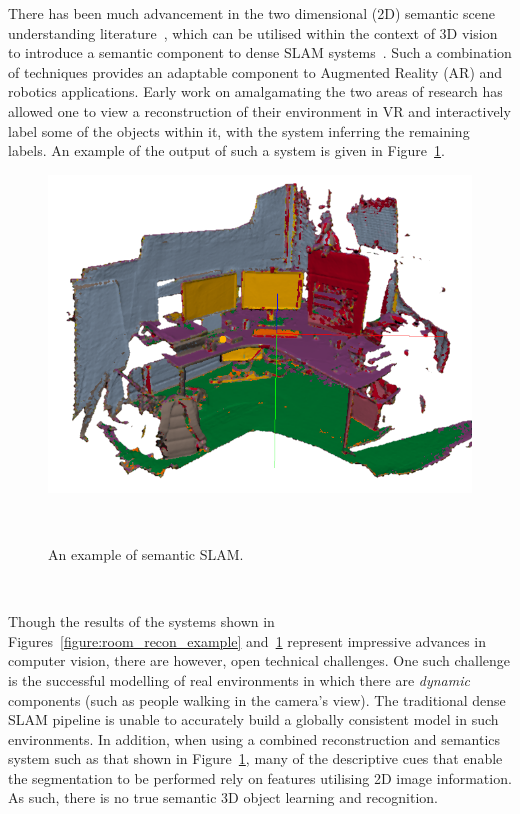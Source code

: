 There has been much advancement in the two dimensional (2D) semantic scene understanding literature~\cite{Girshick2014,Shelhamer2017,Civera2011}, 
which can be utilised within the context of 3D vision to introduce a semantic component to dense SLAM 
systems~\cite{Valentin2015,Golodetz2015,Cavallari2016}. Such a combination of techniques 
provides an adaptable component to Augmented Reality (AR) and robotics applications. Early work on amalgamating the two areas 
of research has allowed one to view a reconstruction of their environment in VR and interactively label some of the objects within it, with 
the system inferring the remaining labels. An example of the output of such a system is given in Figure~\ref{figure:spaint_teaser}.
\begin{figure}[!htbp]
  \centering
  \includegraphics[width=.8\linewidth]{figures/intro/spaint-teaser.png}
  \caption[Room Scale Dense Reconstruction]{An example of semantic SLAM.\footnotemark}
~\label{figure:spaint_teaser}
\end{figure}

~

Though the results of the systems shown in Figures~\ref{figure:room_recon_example} and~\ref{figure:spaint_teaser} 
represent impressive advances in computer vision, there are however, open technical challenges. One such 
challenge is the successful modelling of real environments in which there are \textit{dynamic} components (such as 
people walking in the camera's view). The traditional dense SLAM pipeline is unable to accurately build a 
globally consistent model in such environments. In addition, when using a combined reconstruction and 
semantics system such as that shown in Figure~\ref{figure:spaint_teaser}, many of the descriptive cues that 
enable the segmentation to be performed rely on features utilising 2D image information. As such, there is 
no true semantic 3D object learning and recognition.


